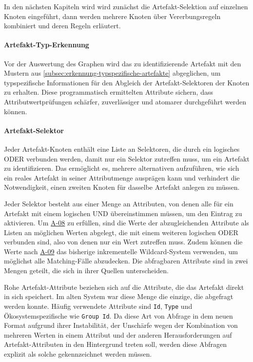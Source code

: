 In den nächsten Kapiteln wird wird zunächst die Artefakt-Selektion auf einzelnen Knoten eingeführt, dann werden mehrere Knoten über Vererbungsregeln kombiniert und deren Regeln erläutert.

\paragraph{Artefakt-Typ-Erkennung}

Vor der Auswertung des Graphen wird das zu identifizierende Artefakt mit den Mustern aus \autoref{subsec:erkennung-typspezifische-artefakte} abgeglichen, um typspezifische Informationen für den Abgleich der Artefakt-Selektoren der Knoten zu erhalten.
Diese programmatisch ermittelten Attribute sichern, dass Attributwertprüfungen schärfer, zuverlässiger und atomarer durchgeführt werden können.

\paragraph{Artefakt-Selektor}

Jeder Artefakt-Knoten enthält eine Liste an Selektoren, die durch ein logisches ODER verbunden werden, damit nur ein Selektor zutreffen muss, um ein Artefakt zu identifizieren.
Das ermöglicht es, mehrere alternativen aufzuführen, wie sich ein reales Artefakt in seiner Attributmenge ausprägen kann und verhindert die Notwendigkeit, einen zweiten Knoten für dasselbe Artefakt anlegen zu müssen.

Jeder Selektor besteht aus einer Menge an Attributen, von denen alle für ein Artefakt mit einem logischen UND übereinstimmen müssen, um den Eintrag zu aktivieren.
Um \hyperref[subsec:req-multiple-attribute-values]{A-08} zu erfüllen, sind die Werte der abzugleichenden Attribute als Listen an möglichen Werten abgelegt, die mit einem weiteren logischen ODER verbunden sind, also von denen nur ein Wert zutreffen muss.
Zudem können die Werte nach \hyperref[subsec:req-regex-support]{A-09} das bisherige inkrementelle Wildcard-System verwenden, um möglichst alle Matching-Fälle abzudecken.
Die abfragbaren Attribute sind in zwei Mengen geteilt, die sich in ihrer Quellen unterscheiden.

Rohe Artefakt-Attribute beziehen sich auf die Attribute, die das Artefakt direkt in sich speichert.
Im alten System war diese Menge die einzige, die abgefragt werden konnte.
Häufig verwendete Attribute sind \texttt{Id}, \texttt{Type} und Ökosystemspezifische wie \texttt{Group Id}.
Da diese Art von Abfrage in dem neuen Format aufgrund ihrer Instabilität, der Unschärfe wegen der Kombination von mehreren Werten in einem Attribut und der anderen Herausforderungen auf Artefakt-Attributen in den Hintergrund treten soll, werden diese Abfragen explizit als solche gekennzeichnet werden müssen.

